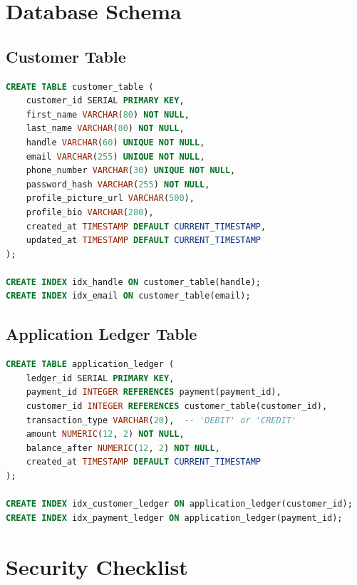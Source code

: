 \documentclass[12pt, a4paper, twoside, openright]{report}
\begin{document}
\chapter{Database Schema}

\section{Customer Table}

\begin{lstlisting}[language=sql]
CREATE TABLE customer_table (
    customer_id SERIAL PRIMARY KEY,
    first_name VARCHAR(80) NOT NULL,
    last_name VARCHAR(80) NOT NULL,
    handle VARCHAR(60) UNIQUE NOT NULL,
    email VARCHAR(255) UNIQUE NOT NULL,
    phone_number VARCHAR(30) UNIQUE NOT NULL,
    password_hash VARCHAR(255) NOT NULL,
    profile_picture_url VARCHAR(500),
    profile_bio VARCHAR(280),
    created_at TIMESTAMP DEFAULT CURRENT_TIMESTAMP,
    updated_at TIMESTAMP DEFAULT CURRENT_TIMESTAMP
);

CREATE INDEX idx_handle ON customer_table(handle);
CREATE INDEX idx_email ON customer_table(email);
\end{lstlisting}

\section{Application Ledger Table}

\begin{lstlisting}[language=sql]
CREATE TABLE application_ledger (
    ledger_id SERIAL PRIMARY KEY,
    payment_id INTEGER REFERENCES payment(payment_id),
    customer_id INTEGER REFERENCES customer_table(customer_id),
    transaction_type VARCHAR(20),  -- 'DEBIT' or 'CREDIT'
    amount NUMERIC(12, 2) NOT NULL,
    balance_after NUMERIC(12, 2) NOT NULL,
    created_at TIMESTAMP DEFAULT CURRENT_TIMESTAMP
);

CREATE INDEX idx_customer_ledger ON application_ledger(customer_id);
CREATE INDEX idx_payment_ledger ON application_ledger(payment_id);
\end{lstlisting}

\chapter{Security Checklist}
\end{document}
